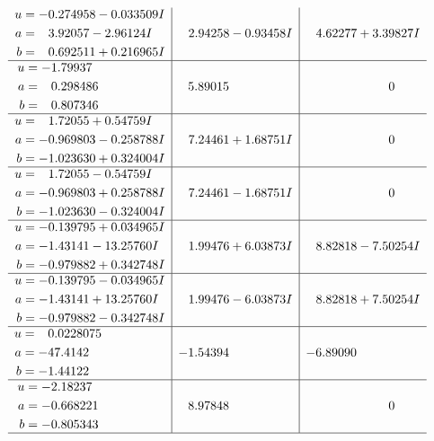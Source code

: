\documentclass[1p]{elsarticle_modified}
\theoremstyle{definition}
\begin{document}
$$\begin{array}{c|c|c}
\begin{aligned}
u &= -0.274958 - 0.033509 I \\
a &= \phantom{-}3.92057 - 2.96124 I \\
b &= \phantom{-}0.692511 + 0.216965 I\end{aligned}
 & \phantom{-}2.94258 - 0.93458 I & \phantom{-}4.62277 + 3.39827 I \\ \hline\begin{aligned}
u &= -1.79937\phantom{ +0.000000I} \\
a &= \phantom{-}0.298486\phantom{ +0.000000I} \\
b &= \phantom{-}0.807346\phantom{ +0.000000I}\end{aligned}
 & \phantom{-}5.89015\phantom{ +0.000000I} & \phantom{-0.000000 } 0 \\ \hline\begin{aligned}
u &= \phantom{-}1.72055 + 0.54759 I \\
a &= -0.969803 - 0.258788 I \\
b &= -1.023630 + 0.324004 I\end{aligned}
 & \phantom{-}7.24461 + 1.68751 I & \phantom{-0.000000 } 0 \\ \hline\begin{aligned}
u &= \phantom{-}1.72055 - 0.54759 I \\
a &= -0.969803 + 0.258788 I \\
b &= -1.023630 - 0.324004 I\end{aligned}
 & \phantom{-}7.24461 - 1.68751 I & \phantom{-0.000000 } 0 \\ \hline\begin{aligned}
u &= -0.139795 + 0.034965 I \\
a &= -1.43141 - 13.25760 I \\
b &= -0.979882 + 0.342748 I\end{aligned}
 & \phantom{-}1.99476 + 6.03873 I & \phantom{-}8.82818 - 7.50254 I \\ \hline\begin{aligned}
u &= -0.139795 - 0.034965 I \\
a &= -1.43141 + 13.25760 I \\
b &= -0.979882 - 0.342748 I\end{aligned}
 & \phantom{-}1.99476 - 6.03873 I & \phantom{-}8.82818 + 7.50254 I \\ \hline\begin{aligned}
u &= \phantom{-}0.0228075\phantom{ +0.000000I} \\
a &= -47.4142\phantom{ +0.000000I} \\
b &= -1.44122\phantom{ +0.000000I}\end{aligned}
 & -1.54394\phantom{ +0.000000I} & -6.89090\phantom{ +0.000000I} \\ \hline\begin{aligned}
u &= -2.18237\phantom{ +0.000000I} \\
a &= -0.668221\phantom{ +0.000000I} \\
b &= -0.805343\phantom{ +0.000000I}\end{aligned}
 & \phantom{-}8.97848\phantom{ +0.000000I} & \phantom{-0.000000 } 0\\
 \hline 
 \end{array}$$\newpage\newpage\renewcommand{\arraystretch}{1}
\end{document}
